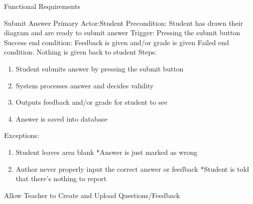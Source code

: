 \documentclass{article}
\begin{document}
\begin{section}{Functional Requirements}
    \begin{subsection}{Submit Answer}
    Primary Actor:Student \newline
    Precondition: Student has drawn their diagram and are ready to submit answer \newline
    Trigger: Pressing the submit button \newline
    Success end condition: Feedback is given and/or grade is given       \newline
    Failed end condition: Nothing is given back to student      \newline
    \newline
    Steps:
    \begin{enumerate}
    \item{Student submits answer by pressing the submit             button}
    \item{System processes answer and decides validity}
    \item{Outputs feedback and/or grade for student to see}
    \item{Answer is saved into database}
    \end{enumerate}
    Exceptions:
    \begin{enumerate}
    \item{Student leaves area blank \newline
	*Answer is just marked as wrong}
	\addtocounter{enumi}{1}
    \item{Author never properly input the correct answer or     feedback \newline
	*Student is told that there's nothing to report}
    \end{enumerate}
    \end{subsection}
    
    \begin{subsection}{Allow Teacher to Create and Upload       Questions/Feedback}
    

\end{subsection}
\end{section}
\end{document}
